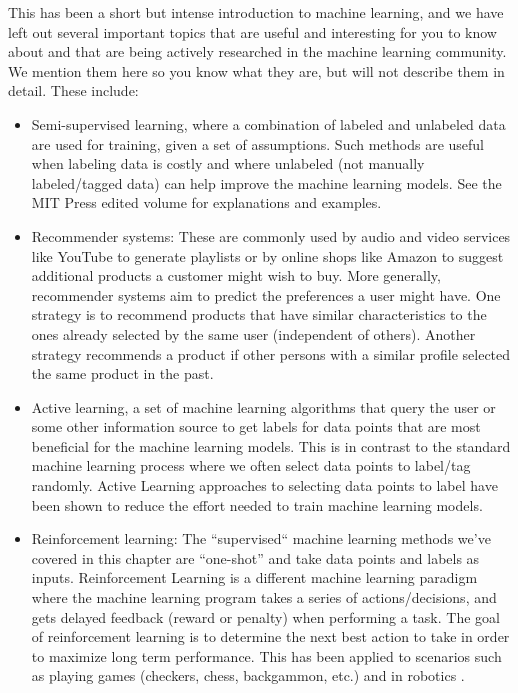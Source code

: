 \documentclass[]{krantz}
\begin{document}
This has been a short but intense introduction to machine learning, and
we have left out several important topics that are useful and
interesting for you to know about and that are being actively researched
in the machine learning community. We mention them here so you know what
they are, but will not describe them in detail. These include:

\begin{itemize}
\item
  Semi-supervised learning, where a combination of labeled and unlabeled
  data are used for training, given a set of assumptions. Such methods
  are useful when labeling data is costly and where unlabeled (not
  manually labeled/tagged data) can help improve the machine learning
  models. See the MIT Press edited volume \citep{Chapelle2006} for
  explanations and examples.
\item
  Recommender systems: These are commonly used by audio and video
  services like YouTube to generate playlists or by online shops like
  Amazon to suggest additional products a customer might wish to buy.
  More generally, recommender systems aim to predict the preferences a
  user might have. One strategy is to recommend products that have
  similar characteristics to the ones already selected by the same user
  (independent of others). Another strategy recommends a product if
  other persons with a similar profile selected the same product in the
  past.
\item
  Active learning, a set of machine learning algorithms that query the
  user or some other information source to get labels for data points
  that are most beneficial for the machine learning models. This is in
  contrast to the standard machine learning process where we often
  select data points to label/tag randomly. Active Learning approaches
  to selecting data points to label have been shown to reduce the effort
  needed to train machine learning models.
\item
  Reinforcement learning: The ``supervised`` machine learning methods
  we've covered in this chapter are ``one-shot'' and take data points
  and labels as inputs. Reinforcement Learning is a different machine
  learning paradigm where the machine learning program takes a series of
  actions/decisions, and gets delayed feedback (reward or penalty) when
  performing a task. The goal of reinforcement learning is to determine
  the next best action to take in order to maximize long term
  performance. This has been applied to scenarios such as playing games
  (checkers, chess, backgammon, etc.) and in robotics
  \citep{Sutton2018}.
\end{itemize}
\end{document}
